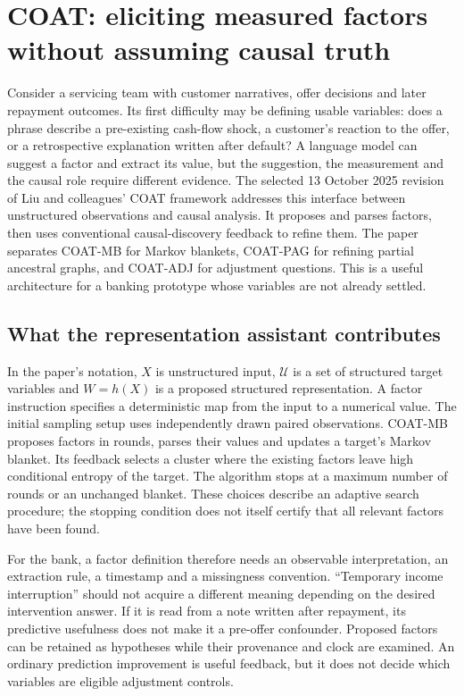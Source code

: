 \section{COAT: eliciting measured factors without assuming causal truth}
\label{exec19:coat-scope}

Consider a servicing team with customer narratives, offer decisions and later
repayment outcomes. Its first difficulty may be defining usable variables:
does a phrase describe a pre-existing cash-flow shock, a customer's reaction to
the offer, or a retrospective explanation written after default? A language
model can suggest a factor and extract its value, but the suggestion, the
measurement and the causal role require different evidence. The selected
13 October 2025 revision of Liu and colleagues' COAT framework addresses this
interface between unstructured observations and causal analysis. It proposes
and parses factors, then uses conventional causal-discovery feedback to refine
them. The paper separates COAT-MB for Markov blankets, COAT-PAG for refining
partial ancestral graphs, and COAT-ADJ for adjustment questions. This is a
useful architecture for a banking prototype whose variables are not already
settled.~\citep{exec19_coat}

\subsection{What the representation assistant contributes}
\label{exec19:coat-representation}
In the paper's notation, $X$ is unstructured input, $\mathcal U$ is a set of
structured target variables and $W=h(X)$ is a proposed structured
representation. A factor instruction specifies a deterministic map from the
input to a numerical value. The initial sampling setup uses independently
drawn paired observations. COAT-MB proposes factors in rounds, parses their
values and updates a target's Markov blanket. Its feedback selects a cluster
where the existing factors leave high conditional entropy of the target. The
algorithm stops at a maximum number of rounds or an unchanged blanket.
These choices describe an adaptive search procedure; the stopping condition
does not itself certify that all relevant factors have been found.
\citep{exec19_coat}

For the bank, a factor definition therefore needs an observable interpretation,
an extraction rule, a timestamp and a missingness convention. ``Temporary
income interruption'' should not acquire a different meaning depending on the
desired intervention answer. If it is read from a note written after repayment,
its predictive usefulness does not make it a pre-offer confounder. Proposed
factors can be retained as hypotheses while their provenance and clock are
examined. An ordinary prediction improvement is useful feedback, but it does
not decide which variables are eligible adjustment controls.

